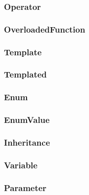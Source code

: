 \subsubsection{Operator}

\subsubsection{OverloadedFunction}

\subsubsection{Template}

\subsubsection{Templated}

\subsubsection{Enum}

\subsubsection{EnumValue}

\subsubsection{Inheritance}

\subsubsection{Variable}

\subsubsection{Parameter}
